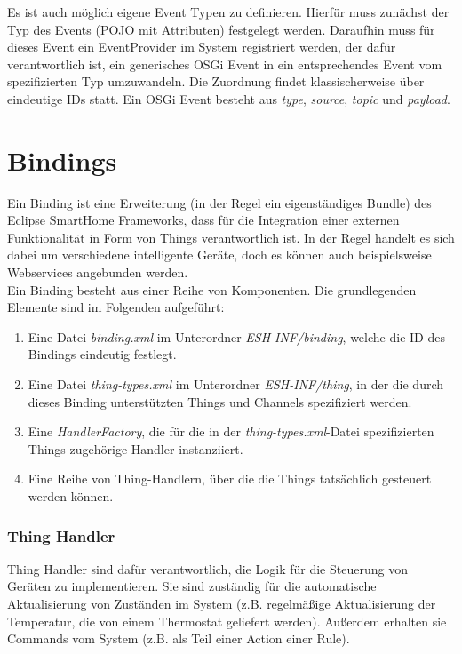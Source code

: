 Es ist auch möglich eigene Event Typen zu definieren. Hierfür muss zunächst der Typ des Events (POJO mit Attributen) festgelegt werden. Daraufhin muss für dieses Event ein EventProvider im System registriert werden, der dafür verantwortlich ist, ein generisches OSGi Event in ein entsprechendes Event vom spezifizierten Typ umzuwandeln. Die Zuordnung findet klassischerweise über eindeutige IDs statt. Ein OSGi Event besteht aus \textit{type}, \textit{source}, \textit{topic} und \textit{payload}.


\section{Bindings}
\label{esh:bindings}
Ein Binding ist eine Erweiterung (in der Regel ein eigenständiges Bundle) des Eclipse SmartHome Frameworks, dass für die Integration einer externen Funktionalität in Form von Things verantwortlich ist. 
In der Regel handelt es sich dabei um verschiedene intelligente Geräte, doch es können auch beispielsweise Webservices angebunden werden.\\

Ein Binding besteht aus einer Reihe von Komponenten. Die grundlegenden Elemente sind im Folgenden aufgeführt:

\begin{enumerate}
\item Eine Datei \textit{binding.xml} im Unterordner \textit{ESH-INF/binding}, welche die ID des Bindings eindeutig festlegt.
\item Eine Datei \textit{thing-types.xml} im Unterordner \textit{ESH-INF/thing}, in der die durch dieses Binding unterstützten Things und Channels spezifiziert werden.
\item Eine \textit{HandlerFactory}, die für die in der \textit{thing-types.xml}-Datei spezifizierten Things zugehörige Handler instanziiert.
\item Eine Reihe von Thing-Handlern, über die die Things tatsächlich gesteuert werden können.
\end{enumerate}


\subsubsection{Thing Handler}
Thing Handler sind dafür verantwortlich, die Logik für die Steuerung von Geräten zu implementieren. Sie sind zuständig für die automatische Aktualisierung von Zuständen im System (z.B. regelmäßige Aktualisierung der Temperatur, die von einem Thermostat geliefert werden). Außerdem erhalten sie Commands vom System (z.B. als Teil einer Action einer Rule).








